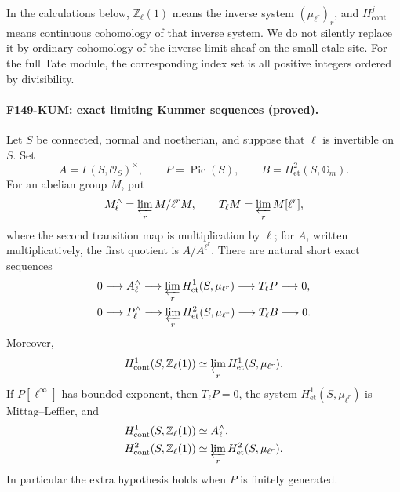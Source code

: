 \documentclass[11pt,a4paper]{article}
\theoremstyle{definition}
\begin{document}
In the calculations below, \(\mathbb Z_\ell(1)\) means the inverse system
\((\mu_{\ell^r})_r\), and \(H^j_{\mathrm{cont}}\) means continuous
cohomology of that inverse system.  We do not silently replace it by
ordinary cohomology of the inverse-limit sheaf on the small etale site.
For the full Tate module, the corresponding index set is all positive
integers ordered by divisibility.

\paragraph{F149-KUM: exact limiting Kummer sequences (proved).}
Let \(S\) be connected, normal and noetherian, and suppose that \(\ell\)
is invertible on \(S\).  Set
\[
 A=\Gamma(S,\mathcal O_S)^\times,\qquad
 P=\operatorname{Pic}(S),\qquad
 B=H^2_{\mathrm{et}}(S,\mathbb G_m).
\]
For an abelian group \(M\), put
\[
 M^\wedge_\ell=\varprojlim_r M/\ell^rM,
 \qquad
 T_\ell M=\varprojlim_r M[\ell^r],
\]
where the second transition map is multiplication by \(\ell\);
for \(A\), written multiplicatively, the first quotient is
\(A/A^{\ell^r}\).  There are natural short exact sequences
\begin{align}
 0&\longrightarrow A^\wedge_\ell
   \longrightarrow \varprojlim_r H^1_{\mathrm{et}}(S,\mu_{\ell^r})
   \longrightarrow T_\ell P\longrightarrow 0,\label{eq:arc-kum-h1}\\
 0&\longrightarrow P^\wedge_\ell
   \longrightarrow \varprojlim_r H^2_{\mathrm{et}}(S,\mu_{\ell^r})
   \longrightarrow T_\ell B\longrightarrow 0.\label{eq:arc-kum-h2}
\end{align}
Moreover,
\[
 H^1_{\mathrm{cont}}(S,\mathbb Z_\ell(1))
 \simeq \varprojlim_r H^1_{\mathrm{et}}(S,\mu_{\ell^r}).
\]
If \(P[\ell^\infty]\) has bounded exponent, then \(T_\ell P=0\), the
system \(H^1_{\mathrm{et}}(S,\mu_{\ell^r})\) is Mittag--Leffler, and
\begin{align*}
 H^1_{\mathrm{cont}}(S,\mathbb Z_\ell(1))&\simeq A^\wedge_\ell,\\
 H^2_{\mathrm{cont}}(S,\mathbb Z_\ell(1))
 &\simeq \varprojlim_r H^2_{\mathrm{et}}(S,\mu_{\ell^r}).
\end{align*}
In particular the extra hypothesis holds when \(P\) is finitely generated.
\end{document}
